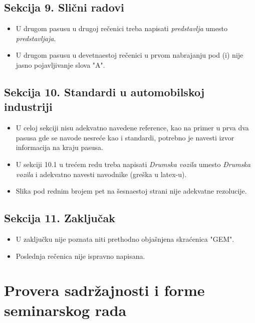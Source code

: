 \documentclass[a4paper]{report}
\begin{document}
\subsection{Sekcija 9. Slični radovi}
\begin{itemize}

\item U drugom pasusu u drugoj rečenici treba napisati \textit{predstavlja} umesto \textit{predstavljaja}.

\item U drugom pasusu u devetnaestoj rečenici u prvom nabrajanju pod (i) nije jasno pojavljivanje slova "A".

\end{itemize}


\subsection{Sekcija 10. Standardi u automobilskoj industriji}
\begin{itemize}

\item U celoj sekciji nisu adekvatno navedene reference, kao na primer u prva dva pasusa gde se navode nesreće kao i standardi, potrebno je navesti izvor informacija na kraju pasusa.

\item U sekciji 10.1 u trećem redu treba napisati \textit{Drumska vozila} umesto \textit{Đrumska vozila} i adekvatno navesti navodnike (greška u latex-u).

\item Slika pod rednim brojem pet na šesnaestoj strani nije adekvatne rezolucije.
 
\end{itemize}


\subsection{Sekcija 11. Zaključak}

\begin{itemize}

\item U zaključku nije poznata niti prethodno objašnjena skraćenica "GEM".

\item Poslednja rečenica nije ispravno napisana.
\end{itemize}

\section{Provera sadržajnosti i forme seminarskog rada}
\end{document}
